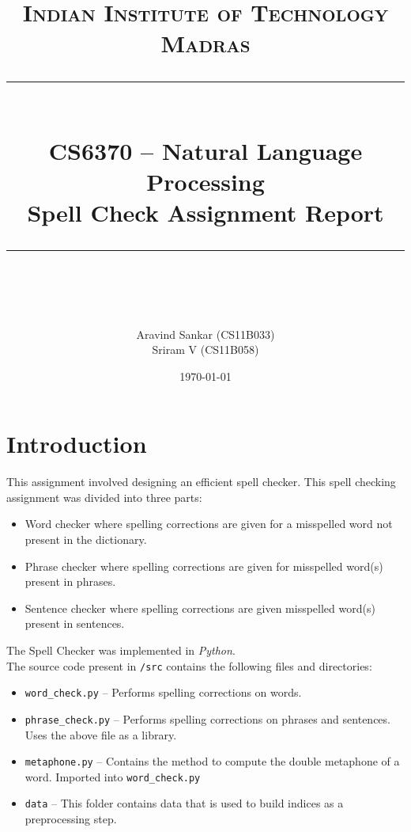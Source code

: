 \newcommand{\horrule}[1]{\rule{\linewidth}{#1}} %

\title{	
\normalfont \normalsize 
\textsc{Indian Institute of Technology Madras} \\ [25pt] %
\horrule{0.5pt} \\[0.4cm] %
\huge CS6370 -- Natural Language Processing \\ Spell Check Assignment Report \\ %
\horrule{2pt} \\[0.5cm] %
}
\author{\large Aravind Sankar (CS11B033) \\ \large Sriram V (CS11B058)} %

\date{\normalsize\today} %



\maketitle
\thispagestyle{empty}
\section{Introduction}
This assignment involved designing an efficient spell checker. This spell checking assignment was divided into three parts: 
\begin{itemize}
\itemsep1pt\parskip0pt
\item Word checker where spelling corrections are given for a misspelled word not present in the dictionary.
\item Phrase checker where spelling corrections are given for misspelled word(s) present in phrases.
\item Sentence checker where spelling corrections are given misspelled word(s) present in sentences.
\end{itemize}

The Spell Checker was implemented in \textit{Python}.\\

The source code present in \texttt{/src} contains the following files and directories:
\begin{itemize}
\itemsep1pt\parskip0pt
    \item
        \texttt{word\_check.py} -- Performs spelling corrections on words.
    \item
        \texttt{phrase\_check.py} -- Performs spelling corrections on phrases and sentences. Uses the above file as a library.
    \item
        \texttt{metaphone.py} -- Contains the method to compute the double metaphone of a word. Imported into \texttt{word\_check.py}
    \item
        \texttt{data} -- This folder contains data that is used to build indices as a preprocessing step.
\end{itemize}

